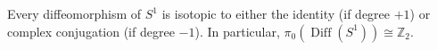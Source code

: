 Every diffeomorphism of $S^1$ is isotopic to either the identity (if degree $+1$) or complex conjugation (if degree $-1$). In particular, $\pi_0(\operatorname{Diff}(S^1)) \cong \mathbb{Z}_2$.
